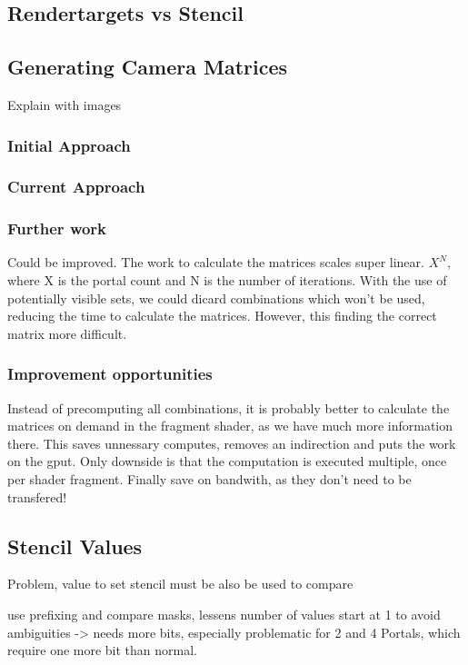 \subsection{Rendertargets vs Stencil}

\subsection{Generating Camera Matrices}
Explain with images


\subsubsection{Initial Approach}
\subsubsection{Current Approach}

\subsubsection{Further work}
Could be improved. The work to calculate the matrices scales super linear. $X^{N}$, where X is the portal count and N is the number of iterations. With the use of potentially visible sets, we could dicard combinations which won't be used, reducing the time to calculate the matrices. However, this finding the correct matrix more difficult.

\subsubsection{Improvement opportunities}
Instead of precomputing all combinations, it is probably better to calculate the matrices on demand in the fragment shader, as we have much more information there. This saves unnessary computes, removes an indirection and puts the work on the gput. Only downside is that the computation is executed multiple, once per shader fragment. Finally save on bandwith, as they don't need to be transfered!



\subsection{Stencil Values}
Problem, value to set stencil must be also be used to compare

use prefixing and compare masks, lessens number of values
start at 1 to avoid ambiguities -> needs more bits, especially problematic for 2 and 4 Portals, which require one more bit than normal.





